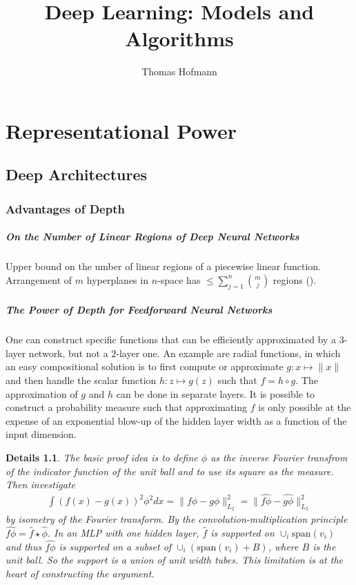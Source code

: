 \documentclass{report}
\author{Thomas Hofmann}
\title{Deep Learning: Models and Algorithms}
\newtheorem{details}{Details}
\begin{document}
\maketitle 

\chapter{Representational Power}
\section{Deep Architectures}

\subsection{Advantages of Depth}


\paragraph{On the Number of Linear Regions of Deep Neural Networks \cite{montufar2014number}}

Upper bound on the umber of linear regions of a piecewise linear function. Arrangement of $m$ hyperplanes in $n$-space has $\le \sum_{j=1}^n \binom{m}{j}$ regions (\cite{zaslavsky1975facing}).

\paragraph{The Power of Depth for Feedforward Neural Networks \cite{eldan2016power}} One can construct specific functions that can be efficiently approximated by a $3$-layer network, but not a $2$-layer one. An example are radial functions, in which an easy compositional solution is to first compute or approximate $g: x \mapsto \|x\|$ and then handle the scalar function $h: z \mapsto g(z)$ such that $f = h \circ g$. The approximation of $g$ and $h$ can be done in separate layers. It is possible to construct a probability measure such that approximating $f$ is only possible at the expense of an exponential blow-up of the hidden layer width as a function of the input dimension. 
\begin{details}
The basic proof idea is to define $\phi$ as the inverse Fourier transfrom of the indicator function of the unit ball and to use its square as the measure. Then investigate
\begin{align}
\int (f(x)-g(x))^2 \phi^2 dx = \| f \phi - g \phi\|^2_{L_2} = \| \widehat {f \phi} - \widehat {g \phi} \|^2_{L_2}
\end{align}
by isometry of the Fourier transform. By the convolution-multiplication principle $\widehat{f \phi} = \hat f \star \hat \phi$. In an MLP with one hidden layer, $\hat f$ is supported on $\cup_i \text{span}(v_i)$ and thus $\widehat {f \phi}$ is supported on a subset of $\cup_i (\text{span}(v_i) +B)$, where $B$ is the unit ball. So the support is a union of unit width tubes. This limitation is at the heart of constructing the argument.
\end{details}





\end{document}
